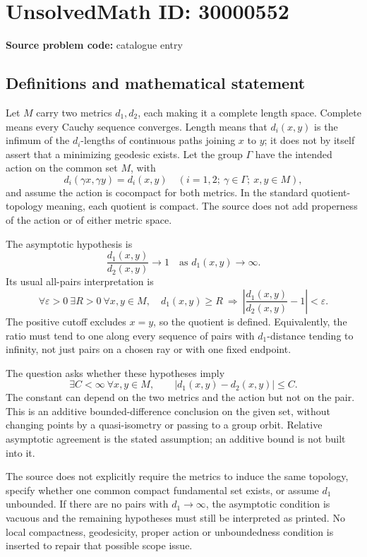 \documentclass[11pt]{article}
\begin{document}
\section*{UnsolvedMath ID: 30000552}
\textbf{Source problem code:} catalogue entry
\subsection{Definitions and mathematical statement}
Let \(M\) carry two metrics \(d_1,d_2\), each making it a complete length space. Complete means every Cauchy sequence converges. Length means that \(d_i(x,y)\) is the infimum of the \(d_i\)-lengths of continuous paths joining \(x\) to \(y\); it does not by itself assert that a minimizing geodesic exists. Let the group \(\Gamma\) have the intended action on the common set \(M\), with
\[
 d_i(\gamma x,\gamma y)=d_i(x,y)
 \quad(i=1,2;\ \gamma\in\Gamma;\ x,y\in M),
\]
and assume the action is cocompact for both metrics. In the standard quotient-topology meaning, each quotient is compact. The source does not add properness of the action or of either metric space.

The asymptotic hypothesis is
\[
 \frac{d_1(x,y)}{d_2(x,y)}\longrightarrow1
 \quad\text{as }d_1(x,y)\to\infty.
\]
Its usual all-pairs interpretation is
\[
 \forall\varepsilon>0\ \exists R>0\ \forall x,y\in M,
 \quad d_1(x,y)\geq R\ \Longrightarrow\
 \left|\frac{d_1(x,y)}{d_2(x,y)}-1\right|<\varepsilon.
\]
The positive cutoff excludes \(x=y\), so the quotient is defined. Equivalently, the ratio must tend to one along every sequence of pairs with \(d_1\)-distance tending to infinity, not just pairs on a chosen ray or with one fixed endpoint.

The question asks whether these hypotheses imply
\[
 \exists C<\infty\ \forall x,y\in M,\qquad
 |d_1(x,y)-d_2(x,y)|\leq C.
\]
The constant can depend on the two metrics and the action but not on the pair. This is an additive bounded-difference conclusion on the given set, without changing points by a quasi-isometry or passing to a group orbit. Relative asymptotic agreement is the stated assumption; an additive bound is not built into it.

The source does not explicitly require the metrics to induce the same topology, specify whether one common compact fundamental set exists, or assume \(d_1\) unbounded. If there are no pairs with \(d_1\to\infty\), the asymptotic condition is vacuous and the remaining hypotheses must still be interpreted as printed. No local compactness, geodesicity, proper action or unboundedness condition is inserted to repair that possible scope issue.
\end{document}
